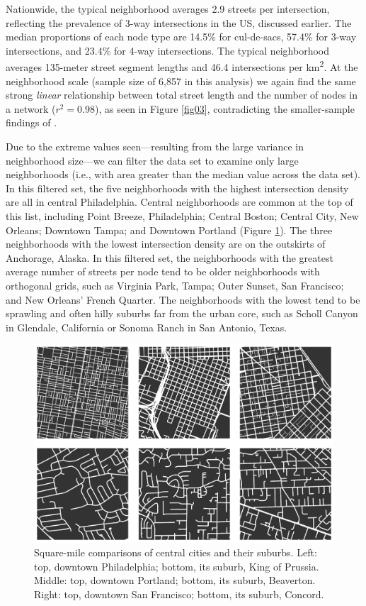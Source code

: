 \documentclass{article}
\begin{document}
Nationwide, the typical neighborhood averages 2.9 streets per intersection, reflecting the prevalence of 3-way intersections in the US, discussed earlier. The median proportions of each node type are 14.5\% for cul-de-sacs, 57.4\% for 3-way intersections, and 23.4\% for 4-way intersections. The typical neighborhood averages 135-meter street segment lengths and 46.4 intersections per km\textsuperscript{2}. At the neighborhood scale (sample size of 6,857 in this analysis) we again find the same strong \emph{linear} relationship between total street length and the number of nodes in a network ($r^{2}=0.98$), as seen in Figure \ref{fig03}, contradicting the smaller-sample findings of \citet{strano_urban_2013}.

Due to the extreme values seen---resulting from the large variance in neighborhood size---we can filter the data set to examine only large neighborhoods (i.e., with area greater than the median value across the data set). In this filtered set, the five neighborhoods with the highest intersection density are all in central Philadelphia. Central neighborhoods are common at the top of this list, including Point Breeze, Philadelphia; Central Boston; Central City, New Orleans; Downtown Tampa; and Downtown Portland (Figure \ref{fig05}). The three neighborhoods with the lowest intersection density are on the outskirts of Anchorage, Alaska. In this filtered set, the neighborhoods with the greatest average number of streets per node tend to be older neighborhoods with orthogonal grids, such as Virginia Park, Tampa; Outer Sunset, San Francisco; and New Orleans' French Quarter. The neighborhoods with the lowest tend to be sprawling and often hilly suburbs far from the urban core, such as Scholl Canyon in Glendale, California or Sonoma Ranch in San Antonio, Texas.

\begin{figure}
	\includegraphics[width=1\textwidth]{media/fig05.png}
	\caption{Square-mile comparisons of central cities and their suburbs. Left: top, downtown Philadelphia; bottom, its suburb, King of Prussia. Middle: top, downtown Portland; bottom, its suburb, Beaverton. Right: top, downtown San Francisco; bottom, its suburb, Concord.}
	\label{fig05}
\end{figure}
\end{document}
